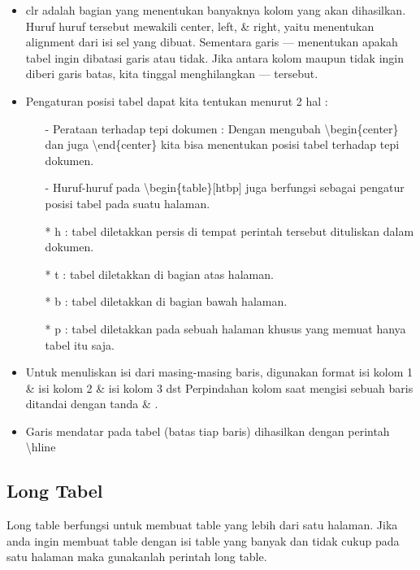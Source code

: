 \begin{itemize}
\item {\textbar c\textbar l\textbar r\textbar} adalah bagian yang menentukan banyaknya kolom yang akan dihasilkan.    Huruf huruf tersebut mewakili center, left, \& right, yaitu menentukan alignment dari isi sel yang dibuat. Sementara garis — menentukan apakah tabel ingin dibatasi garis atau tidak. Jika antara kolom maupun tidak ingin diberi garis batas, kita tinggal menghilangkan — tersebut.
\item  Pengaturan posisi tabel dapat kita tentukan menurut 2 hal :
\begin{itemize}
	  \item[-] Perataan terhadap tepi dokumen : Dengan mengubah \textbackslash begin\{center\} dan juga
 	     \textbackslash end\{center\} kita bisa menentukan posisi tabel terhadap tepi dokumen.
 	  \item[-] Huruf-huruf pada \textbackslash begin\{table\}[htbp] juga berfungsi sebagai pengatur posisi tabel
                   pada suatu halaman.
\end{itemize}
	\begin{itemize}
	  \item[*] h : tabel diletakkan persis di tempat perintah tersebut dituliskan dalam     dokumen.
	\item[*]  t  : tabel diletakkan di bagian atas halaman.
	\item[*]  b : tabel diletakkan di bagian bawah halaman.
	\item[*]  p : tabel diletakkan pada sebuah halaman khusus yang memuat hanya tabel itu saja.
	\end{itemize}
\item  Untuk menuliskan isi dari masing-masing baris, digunakan format
isi kolom 1 \& isi kolom 2 \& isi kolom 3 dst
Perpindahan kolom saat mengisi sebuah baris ditandai dengan tanda \& .

\item Garis mendatar pada tabel (batas tiap baris) dihasilkan dengan perintah \textbackslash hline
\end{itemize}
\subsection{Long Tabel}
\begin{raggedleft}Long table berfungsi untuk membuat table yang lebih dari satu halaman. Jika anda ingin membuat table dengan isi table yang banyak dan tidak cukup pada satu halaman maka gunakanlah perintah long table.\end{raggedleft}\\

